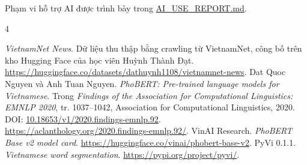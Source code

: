 Phạm vi hỗ trợ AI được trình bày trong \href{https://github.com/dathuynh1108/CO5177-PFDAV/blob/main/AI_USE_REPORT.md}{AI\_USE\_REPORT.md}.

\begin{thebibliography}{4}
 \emph{VietnamNet News}. Dữ liệu thu thập bằng crawling từ VietnamNet, công bố trên kho Hugging Face của học viên Huỳnh Thành Đạt. \url{https://huggingface.co/datasets/dathuynh1108/vietnamnet-news}.
 Dat Quoc Nguyen và Anh Tuan Nguyen. \emph{PhoBERT: Pre-trained language models for Vietnamese}. Trong \emph{Findings of the Association for Computational Linguistics: EMNLP 2020}, tr. 1037--1042, Association for Computational Linguistics, 2020. DOI: \href{https://doi.org/10.18653/v1/2020.findings-emnlp.92}{10.18653/v1/2020.findings-emnlp.92}. \url{https://aclanthology.org/2020.findings-emnlp.92/}.
 VinAI Research. \emph{PhoBERT Base v2 model card}. \url{https://huggingface.co/vinai/phobert-base-v2}.
 PyVi 0.1.1. \emph{Vietnamese word segmentation}. \url{https://pypi.org/project/pyvi/}.
\end{thebibliography}
